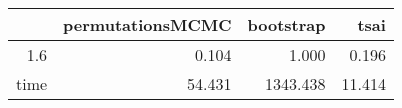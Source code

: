 \begin{table}[ht]
\centering
\begingroup\tiny
\begin{tabular}{rrrr}
  \hline
 & permutationsMCMC & bootstrap & tsai \\ 
  \hline
1.6 & 0.104 & 1.000 & 0.196 \\ 
  time & 54.431 & 1343.438 & 11.414 \\ 
   \hline
\end{tabular}
\endgroup
\end{table}
